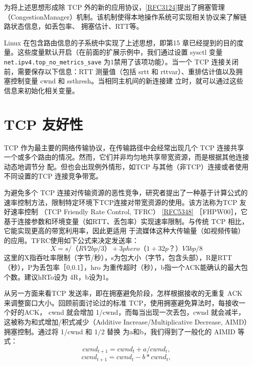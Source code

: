 为将上述思想形成除 TCP 外的新的应用协议，\href{https://www.rfc-editor.org/rfc/rfc3124}{[RFC3124]}提出了拥塞管理（CongestionManager）机制。该机制使得本地操作系统可实现相关协议来了解链路状态信息，如丢包率、
拥塞估计、RTT等。

Linux 在包含路由信息的子系统中实现了上述思想，即第15 章已经提到的目的度量。这些度量默认开启（在前面的扩展示例中，我们通过设置 sysctl 变量 \verb|net.ipv4.top_no_metrics_save|
为1禁用了该项功能）。当一个 TCP 连接关闭前，需要保存以下信息：RTT 测量值（包括 srtt 和 rttvar）、重排估计值以及拥塞控制变量 cwnd 和 ssthresh。当相同主机间的新连接建
立时，就可以通过这些信息来初始化相关变量。

\section{TCP 友好性}
TCP 作为最主要的网络传输协议，在传输路径中会经常出现几个 TCP 连接共享一个或多个路由的情况。然而，它们并非均匀地共享带宽资源，而是根据其他连接动态地调节分
配。但也会出现例外情形，如TCP 与其他（非TCP）连接或者使用不同设置的TCP 连接竞争带宽。

为避免多个 TCP 连接对传输资源的恶性竞争，研究者提出了一种基于计算公式的速率控制方法，限制特定环境下TCP连接对带宽资源的使用。该方法称为TCP 友好速率控制
（TCP Friendly Rate Control, TFRC） \href{https://www.rfc-editor.org/rfc/rfc5348}{[RFC5348]} ［FHPW00］，它基于连接参数和环境变量（如RTT、丢包率）实现速率限制。与传统 TCP 相比，它能实现更高的带宽利用率，因此更适用
于流媒体这种大传输量（如视频传输）的应用。TFRC使用如下公式来决定发送率：
\begin{equation}
    X=s/（R V2bp/3） + 3phero（1 + 32p？）V3bp/8
\end{equation}
这里的X指吞吐率限制（字节/秒），s为包大小（字节，包含头部），R是RTT（秒），P为丢包率［0,0.1］，hro 为重传超时（秒），b指一个ACK能确认的最大包个数。建议hRTo设为
4R，b设为1。

从另一方面来看TCP 发送率，即在拥塞避免阶段，怎样根据接收的无重复 ACK来调整窗口大小。回顾前面讨论过的标准 TCP，使用拥塞避免算法时，每接收一个好的ACK，
cwnd 就会增加 1/cwnd，而每当出现一次丢包，cwnd 就会减半，这被称为和式增加/积式减少（Additive Increase/Multiplicative Decrease, AIMD）拥塞控制。通过将 1/cwnd 和 1/2 替换
为a和b，我们得到了一般化的 AIMID 等式：
\begin{equation}
    cwnd_{t+1} = cwnd_{t} + a/cwnd_{t},
\end{equation}
\begin{equation}
    cwnd_{t+1} = cwnd_{t} - b*cwnd_{t},
\end{equation}

